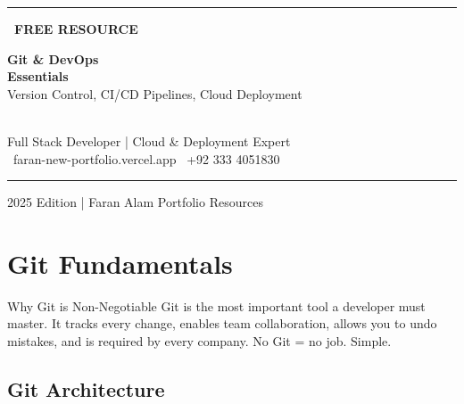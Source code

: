 \documentclass[12pt,a4paper]{article}
\begin{document}
\begin{titlepage}
    \pagecolor{FaranDark}\color{white}\centering\vspace*{2cm}
    {\color{FaranRed}\rule{\textwidth}{3pt}}\vspace{1cm}
    \begin{tcolorbox}[colback=FaranRed, colframe=FaranRed, width=0.45\textwidth, arc=20pt, boxrule=0pt, halign=center]
        \centering\color{white}\textbf{\faGitAlt~FREE RESOURCE}
    \end{tcolorbox}
    \vspace{1cm}
    {\fontsize{36}{44}\selectfont\textbf{Git \& DevOps}}\\[0.3cm]
    {\fontsize{40}{48}\selectfont\color{FaranRed}\textbf{Essentials}}\\[0.5cm]
    {\large Version Control, CI/CD Pipelines, Cloud Deployment}
    \vspace{2cm}
    \begin{tcolorbox}[colback=white!10, colframe=FaranRed, width=0.65\textwidth, arc=8pt, boxrule=1.5pt, halign=center]
        \\[0.2cm]
        {\color{FaranLight}Full Stack Developer | Cloud \& Deployment Expert}\\[0.3cm]
        {\small\color{FaranLight}\faGlobe~faran-new-portfolio.vercel.app \quad \faWhatsapp~+92 333 4051830}
    \end{tcolorbox}
    \vfill
    {\color{FaranRed}\rule{\textwidth}{3pt}}
    {\small\color{FaranGray}2025 Edition | Faran Alam Portfolio Resources}
\end{titlepage}
\pagecolor{white}\color{DarkText}
\tableofcontents\newpage

\section{Git Fundamentals}

\begin{infobox}{Why Git is Non-Negotiable}
Git is the most important tool a developer must master. It tracks every change, enables team collaboration, allows you to undo mistakes, and is required by every company. No Git = no job. Simple.
\end{infobox}

\subsection{Git Architecture}
\end{document}
